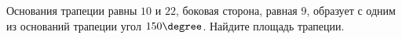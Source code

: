 \begin{ex}
	\begin{condition}
		Основания трапеции равны \( 10  \) и \( 22 \), боковая сторона, равная \( 9 \), образует с одним из оснований трапеции угол \( 150 \degree \). Найдите площадь трапеции.
	\end{condition}
\end{ex}